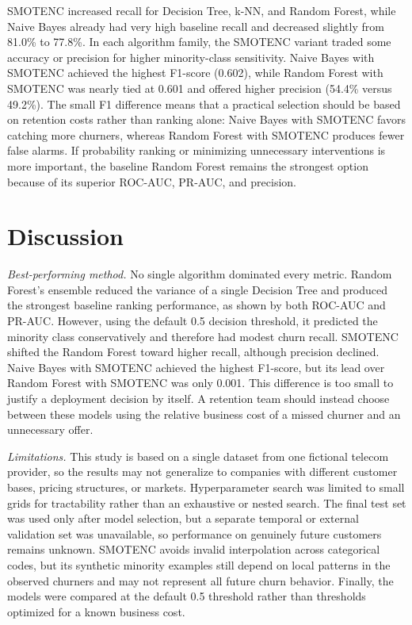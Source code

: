 \documentclass[conference]{IEEEtran}
\begin{document}
	SMOTENC increased recall for Decision Tree, k-NN, and Random Forest, while Naive Bayes already had very high baseline recall and decreased slightly from 81.0\% to 77.8\%. In each algorithm family, the SMOTENC variant traded some accuracy or precision for higher minority-class sensitivity. Naive Bayes with SMOTENC achieved the highest F1-score (0.602), while Random Forest with SMOTENC was nearly tied at 0.601 and offered higher precision (54.4\% versus 49.2\%). The small F1 difference means that a practical selection should be based on retention costs rather than ranking alone: Naive Bayes with SMOTENC favors catching more churners, whereas Random Forest with SMOTENC produces fewer false alarms. If probability ranking or minimizing unnecessary interventions is more important, the baseline Random Forest remains the strongest option because of its superior ROC-AUC, PR-AUC, and precision.
	
	\section{Discussion}
	\label{sec:discussion}
	
	\textit{Best-performing method.} No single algorithm dominated every metric. Random Forest's ensemble reduced the variance of a single Decision Tree and produced the strongest baseline ranking performance, as shown by both ROC-AUC and PR-AUC. However, using the default 0.5 decision threshold, it predicted the minority class conservatively and therefore had modest churn recall. SMOTENC shifted the Random Forest toward higher recall, although precision declined. Naive Bayes with SMOTENC achieved the highest F1-score, but its lead over Random Forest with SMOTENC was only 0.001. This difference is too small to justify a deployment decision by itself. A retention team should instead choose between these models using the relative business cost of a missed churner and an unnecessary offer.
	
	\textit{Limitations.} This study is based on a single dataset from one fictional telecom provider, so the results may not generalize to companies with different customer bases, pricing structures, or markets. Hyperparameter search was limited to small grids for tractability rather than an exhaustive or nested search. The final test set was used only after model selection, but a separate temporal or external validation set was unavailable, so performance on genuinely future customers remains unknown. SMOTENC avoids invalid interpolation across categorical codes, but its synthetic minority examples still depend on local patterns in the observed churners and may not represent all future churn behavior. Finally, the models were compared at the default 0.5 threshold rather than thresholds optimized for a known business cost.
	
\end{document}
